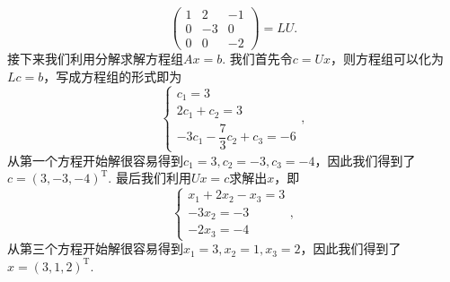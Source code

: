 \documentclass[UTF8,12pt,a4paper,fontset=fandol]{ctexart}
\begin{document}
\begin{solve}
\[\begin{pmatrix}
            1 & 2 & -1 \\ 0 & -3 & 0 \\ 0 & 0 & -2
        \end{pmatrix}=LU.\]
    接下来我们利用分解求解方程组$Ax=b$. 我们首先令$c=Ux$，则方程组可以化为$Lc=b$，写成方程组的形式即为
    \[\begin{cases}
            c_1=3 \\ 2c_1+c_2=3 \\ -3c_1-\dfrac{7}{3}c_2+c_3=-6
        \end{cases},\]
    从第一个方程开始解很容易得到$c_1=3,c_2=-3,c_3=-4$，因此我们得到了$c=(3,-3,-4)^\mathrm{T}$. 最后我们利用$Ux=c$求解出$x$，即
    \[\begin{cases}
            x_1+2x_2-x_3=3 \\ -3x_2=-3 \\ -2x_3=-4
        \end{cases},\]
    从第三个方程开始解很容易得到$x_1=3,x_2=1,x_3=2$，因此我们得到了$x=(3,1,2)^\mathrm{T}$.
\end{solve}
\end{document}
